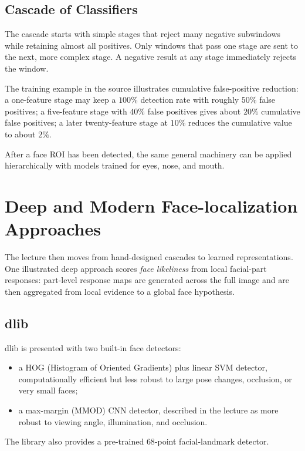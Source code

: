 \documentclass[11pt,a4paper,oneside]{report}
\begin{document}
\subsection{Cascade of Classifiers}

The cascade starts with simple stages that reject many negative subwindows while
retaining almost all positives.  Only windows that pass one stage are sent to
the next, more complex stage.  A negative result at any stage immediately
rejects the window.

The training example in the source illustrates cumulative false-positive
reduction: a one-feature stage may keep a $100\%$ detection rate with roughly
$50\%$ false positives; a five-feature stage with $40\%$ false positives gives
about $20\%$ cumulative false positives; a later twenty-feature stage at $10\%$
reduces the cumulative value to about $2\%$.

After a face ROI has been detected, the same general machinery can be applied
hierarchically with models trained for eyes, nose, and mouth.

\section{Deep and Modern Face-localization Approaches}

The lecture then moves from hand-designed cascades to learned representations.
One illustrated deep approach scores \emph{face likeliness} from local facial-part
responses: part-level response maps are generated across the full image and are
then aggregated from local evidence to a global face hypothesis.

\subsection{dlib}

dlib is presented with two built-in face detectors:
\begin{itemize}
    \item a HOG (Histogram of Oriented Gradients) plus linear SVM detector,
          computationally efficient but less robust to large pose changes,
          occlusion, or very small faces;
    \item a max-margin (MMOD) CNN detector, described in the lecture as more
          robust to viewing angle, illumination, and occlusion.
\end{itemize}
The library also provides a pre-trained $68$-point facial-landmark detector.
\end{document}
